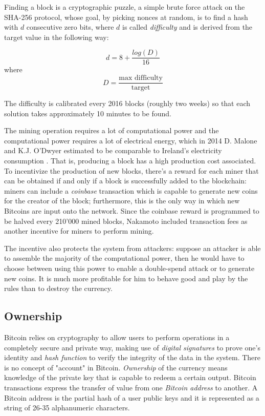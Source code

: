		Finding a block is a cryptographic puzzle, a simple brute force attack on the SHA-256 protocol, whose goal, by picking nonces at random, is to find a hash with \(d\) consecutive zero bits, where \(d\) is called \textit{difficulty} and is derived from the target value in the following way:
		
		\[ d = 8 + \frac{log(D)}{16}\] 
		where
		\[D = \frac{\text{max difficulty}}{\text{target}}\]
		
		The difficulty is calibrated every 2016 blocks (roughly two weeks) so that each solution takes approximately 10 minutes to be found. 
		
		The mining operation requires a lot of computational power and the computational power requires a lot of electrical energy, which in 2014 D. Malone and  K.J. O'Dwyer estimated to be comparable to Ireland's electricity consumption \cite{Malone2014}. That is, producing a block has a high production cost associated. To incentivize the production of new blocks, there's a reward for each miner that can be obtained if and only if a block is successfully added to the blockchain: miners can include a \textit{coinbase} transaction which is capable to generate new coins for the creator of the block; furthermore, this is the only way in which new Bitcoins are input onto the network. Since the coinbase reward is programmed to be halved every 210'000 mined blocks, Nakamoto included transaction fees as another incentive for miners to perform mining.
		
		The incentive also protects the system from attackers: suppose an attacker is able to assemble the majority of the computational power, then he would have to choose between using this power to enable a double-spend attack or to generate new coins. It is much more profitable for him to behave good and play by the rules than to destroy the currency.
		
		\newpage
		
		\subsection{Ownership}
		
		Bitcoin relies on cryptography to allow users to perform operations in a completely secure and private way, making use of \textit{digital signatures} to prove one's identity and \textit{hash function} to verify the integrity of the data in the system.
		There is no concept of "account" in Bitcoin. \textit{Ownership} of the currency means knowledge of the private key that is capable to redeem a certain output. 	Bitcoin transactions express the transfer of value from one \textit{Bitcoin address} to another. A Bitcoin address is the partial hash of a user public keys and it is represented as a string of 26-35 alphanumeric characters.
		
